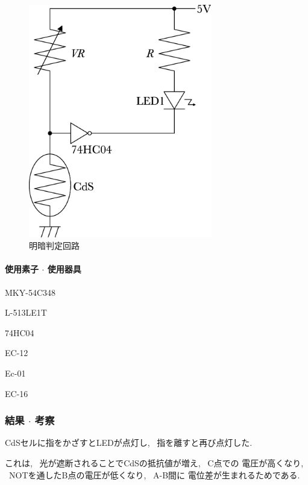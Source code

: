 \documentclass[titlepage]{jsarticle}
\begin{document}
            \begin{figure}[ht]
                \centering
                \includegraphics[width=8cm]{images/hanteikairo.eps}
                \caption{明暗判定回路}
                \label{fig:判定回路}
            \end{figure}

            \paragraph{使用素子 $\cdot$ 使用器具}
                \begin{description}
                    \setlength{\leftskip}{1.5em}
                    \item[CdSセル] MKY-54C348
                    \item[LED] L-513LE1T
                    \item[IC] 74HC04
                    \item[デジタルマルチメータ] EC-12
                    \item[直流電源] Ec-01
                    \item[ブレッドボード] EC-16 
                \end{description}

        \subsubsection{結果 $\cdot$ 考察} \label{明暗判定考察}
            CdSセルに指をかざすとLEDが点灯し, ~指を離すと再び点灯した.

            これは, ~光が遮断されることでCdSの抵抗値が増え, ~C点での
            電圧が高くなり, ~NOTを通したB点の電圧が低くなり, ~A-B間に
            電位差が生まれるためである.
\end{document}
